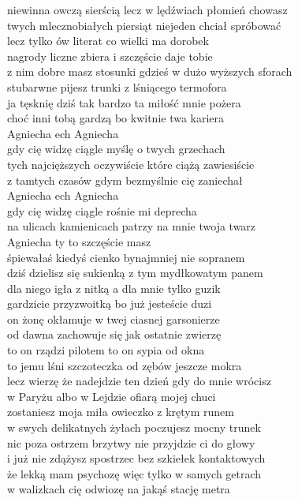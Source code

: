 \begin{text}
    \small{
    niewinna owczą sierścią lecz w lędźwiach płomień chowasz\\
    twych mlecznobiałych piersiąt niejeden chciał spróbować\\
    lecz tylko ów literat co wielki ma dorobek\\
    nagrody liczne zbiera i szczęście daje tobie\\
    z nim dobre masz stosunki gdzieś w dużo wyższych sforach\\
    stubarwne pijesz trunki z lśniącego termofora\\
    ja tęsknię dziś tak bardzo ta miłość mnie pożera\\
    choć inni tobą gardzą bo kwitnie twa kariera\\
    Agniecha ech Agniecha\\
    gdy cię widzę ciągle myślę o twych grzechach\\
    tych najcięższych oczywiście które ciążą zawiesiście\\
    z tamtych czasów gdym bezmyślnie cię zaniechał\\
    Agniecha ech Agniecha\\
    gdy cię widzę ciągle rośnie mi deprecha\\
    na ulicach kamienicach patrzy na mnie twoja twarz\\
    Agniecha ty to szczęście masz\\
    śpiewałaś kiedyś cienko bynajmniej nie sopranem\\
    dziś dzielisz się sukienką z tym mydłkowatym panem\\
    dla niego igła z nitką a dla mnie tylko guzik\\
    gardzicie przyzwoitką bo już jesteście duzi\\
    on żonę okłamuje w twej ciasnej garsonierze\\
    od dawna zachowuje się jak ostatnie zwierzę\\
    to on rządzi pilotem to on sypia od okna\\
    to jemu lśni szczoteczka od zębów jeszcze mokra\\
    lecz wierzę że nadejdzie ten dzień gdy do mnie wrócisz\\
    w Paryżu albo w Lejdzie ofiarą mojej chuci\\
    zostaniesz moja miła owieczko z krętym runem\\
    w swych delikatnych żyłach poczujesz mocny trunek\\
    nic poza ostrzem brzytwy nie przyjdzie ci do głowy\\
    i już nie zdążysz spostrzec bez szkiełek kontaktowych\\
    że lekką mam psychozę więc tylko w samych getrach\\
    w walizkach cię odwiozę na jakąś stację metra
    }
\end{text}
\begin{chord}

\end{chord}
